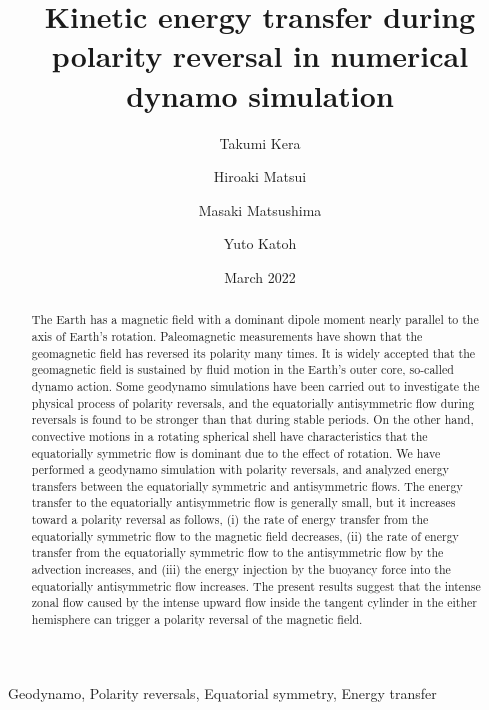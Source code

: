 \documentclass[review]{elsarticle}
\date{March 2022}
\begin{document}
\title{Kinetic energy transfer during polarity reversal in numerical dynamo simulation}

\author[Tohoku]{Takumi Kera}
\author[ucd]{Hiroaki Matsui}
\author[TITECH]{Masaki Matsushima}
\author[Tohoku]{Yuto Katoh}

\address[Tohoku]{Department of Geophysics, Tohoku University, Sendai, Japan.}
\address[ucd]{Department of the Earth and Planetary Sciences, University of California, Davis, CA, USA.}
\address[TITECH]{Department of Earth and Planetary Sciences, Tokyo Institute of Technology, Tokyo, Japan.}

\begin{keyword}
Geodynamo, Polarity reversals, Equatorial symmetry, Energy transfer
\end{keyword}

\begin{abstract}
The Earth has a magnetic field with a dominant dipole moment nearly parallel to the axis of Earth’s rotation. 
Paleomagnetic measurements have shown that the geomagnetic field has reversed its polarity many times. It is widely accepted that the geomagnetic field is sustained by fluid motion in the Earth’s outer core, so-called dynamo action. 
Some geodynamo simulations have been carried out to investigate the physical process of polarity reversals, and the equatorially antisymmetric flow during reversals is found to be stronger than that during stable periods. 
On the other hand, convective motions in a rotating spherical shell have characteristics that the equatorially symmetric flow is dominant due to the effect of rotation. 
We have performed a geodynamo simulation with polarity reversals, and analyzed energy transfers between the equatorially symmetric and antisymmetric flows.
The energy transfer to the equatorially antisymmetric flow is generally small, but it increases toward a polarity reversal as follows, (i) the rate of energy transfer from the equatorially symmetric flow to the magnetic field decreases, (ii) the rate of energy transfer from the equatorially symmetric flow to the antisymmetric flow by the advection increases, and (iii) the energy injection by the buoyancy force into the equatorially antisymmetric flow increases.
The present results suggest that the intense zonal flow caused by the intense upward flow inside the tangent cylinder in the either hemisphere can trigger a polarity reversal of the magnetic field.
\end{abstract}

\maketitle













%
\end{document}
